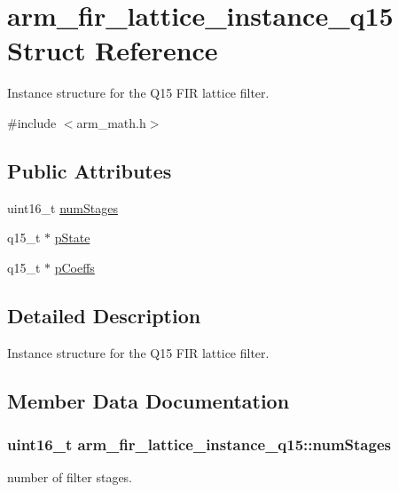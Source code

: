 \hypertarget{structarm__fir__lattice__instance__q15}{}\section{arm\+\_\+fir\+\_\+lattice\+\_\+instance\+\_\+q15 Struct Reference}
\label{structarm__fir__lattice__instance__q15}


Instance structure for the Q15 F\+IR lattice filter.  




{\ttfamily \#include $<$arm\+\_\+math.\+h$>$}

\subsection*{Public Attributes}
\begin{DoxyCompactItemize}
\item 
uint16\+\_\+t \hyperlink{structarm__fir__lattice__instance__q15_a38b179138d6a6c9cac4f8f79b6fd5357}{num\+Stages}
\item 
q15\+\_\+t $\ast$ \hyperlink{structarm__fir__lattice__instance__q15_a37b90dea2bc3ee7c9951a9fe74db0cbb}{p\+State}
\item 
q15\+\_\+t $\ast$ \hyperlink{structarm__fir__lattice__instance__q15_a78f872826140069cf67836fff87360bc}{p\+Coeffs}
\end{DoxyCompactItemize}


\subsection{Detailed Description}
Instance structure for the Q15 F\+IR lattice filter. 

\subsection{Member Data Documentation}
\subsubsection[{\texorpdfstring{num\+Stages}{numStages}}]{\setlength{\rightskip}{0pt plus 5cm}uint16\+\_\+t arm\+\_\+fir\+\_\+lattice\+\_\+instance\+\_\+q15\+::num\+Stages}\hypertarget{structarm__fir__lattice__instance__q15_a38b179138d6a6c9cac4f8f79b6fd5357}{}\label{structarm__fir__lattice__instance__q15_a38b179138d6a6c9cac4f8f79b6fd5357}
number of filter stages. 
